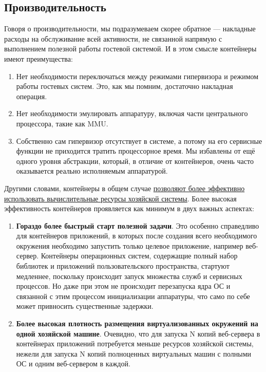 \documentclass[14pt, a4paper]{article}
\begin{document}
\subsection*{Производительность}

Говоря о производительности, мы подразумеваем скорее обратное — накладные расходы на
обслуживание всей активности, не связанной напрямую с выполнением полезной работы гостевой
системой. И в этом смысле контейнеры имеют преимущества:

\begin{enumerate}
    \item Нет необходимости переключаться между режимами гипервизора и режимом работы гостевых
    систем. Это, как мы помним, достаточно накладная операция.
    \item Нет необходимости эмулировать аппаратуру, включая части центрального процессора, такие
    как MMU.
    \item Собственно сам гипервизор отсутствует в системе, а потому на его сервисные функции не
    приходится тратить процессорное время. Мы избавлены от ещё одного уровня абстракции,
    который, в отличие от контейнеров, очень часто оказывается реально исполняемым
    аппаратурой.
\end{enumerate}

Другими словами, контейнеры в общем случае \href{https://www.stratoscale.com/blog/data-center/running-containers-on-bare-metal}{позволяют более эффективно использовать
вычислительные ресурсы хозяйской системы}. Более высокая эффективность контейнеров
проявляется как минимум в двух важных аспектах:

\begin{enumerate}
    \item \textbf{Гораздо более быстрый старт полезной задачи}. Это особенно справедливо для
    контейнеров приложений, в которых после создания всего необходимого окружения
    необходимо запустить только целевое приложение, например веб-сервер. Контейнеры
    операционных систем, содержащие полный набор библиотек и приложений пользовательского
    пространства, стартуют медленнее, поскольку происходит запуск множества служб и
    сервисных процессов. Но даже при этом не происходит перезапуска ядра ОС и связанной с
    этим процессом инициализации аппаратуры, что само по себе может привносить
    существенные задержки.
    \item \textbf{Более высокая плотность размещения виртуализованных окружений на одной
    хозяйской машине}. Очевидно, что для запуска N копий веб-сервера в контейнерах
    приложений потребуется меньше ресурсов хозяйской системы, нежели для запуска N копий
    полноценных виртуальных машин с полными ОС и одним веб-сервером в каждой.
\end{enumerate}
\end{document}
